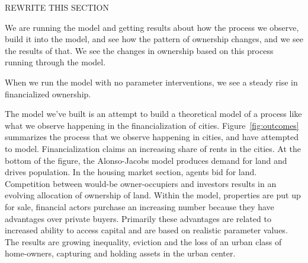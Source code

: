 {\color{red}

REWRITE THIS SECTION 





We are running the model and getting results about how the process we observe, build it into the model, and see how the pattern of ownership changes, and we see the results of that. We see the changes in ownership based on this process running through the model.

When we run the model with no parameter interventions, we see a steady rise in financialized ownership. 

The model we've built is an attempt to build a theoretical model of a process like what we observe happening in the financialization of cities. Figure~\ref{fig:outcomes} summarizes the process that we observe happening in cities, and have attempted to model. Financialization claims an increasing share of rents in the cities. %
At the bottom of the figure, the \gls{Alonso-Jacobs model} produces demand for land and drives population. In the housing market section, agents bid for land. Competition between would-be owner-occupiers and investors results in an evolving allocation of ownership of land. Within the model, properties are put up for sale, financial actors purchase an increasing number because they have advantages over private buyers. Primarily these advantages are related to increased ability to access capital and are based on realistic parameter values. The results are growing inequality, eviction and the loss of an urban class of home-owners, capturing and holding assets in the urban center. %

}
